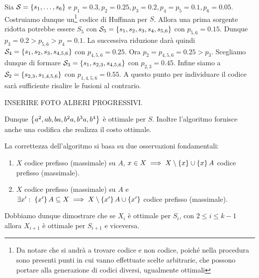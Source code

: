\begin{example}{}
  Sia \(\SCal = \set{s_1,\ldots, s_6}\) e \(p_1 = 0.3,p_2=0.25,p_3=0.2,p_4=p_5=0.1,p_6=0.05\). Costruiamo dunque un\footnote{Da notare che si andrà a trovare  codice e non  codice, poiché nella procedura sono presenti punti in cui vanno effettuate scelte arbitrarie, che possono portare alla generazione di codici diversi, ugualmente ottimali} codice di Huffman per \(S\).
  Allora una prima sorgente ridotta potrebbe essere \(S_5\) con \(\SCal_5 = \set{s_1,s_2,s_3,s_4,s_{5,6}}\) con \(p_{5,6} = 0.15\). Dunque \(p_3 = 0.2 > p_{5,6} > p_4 = 0.1\).
  La successiva riduzione darà quindi \(\SCal_4 = \set{s_1,s_2,s_{3},s_{4,5,6}}\) con \(p_{4,5,6} = 0.25\). Ora \(p_2 = p_{4,5,6} = 0.25 > p_3\).
  Scegliamo dunque di formare \(\SCal_3 = \set{s_1,s_{2,3},s_{4,5,6}}\) con \(p_{2,3} = 0.45\).
  Infine siamo a \(\SCal_2 = \set{s_{2,3}, s_{1,4,5,6}}\) con \(p_{1,4,5,6} = 0.55\).
  A questo punto per individuare il codice sarà sufficiente risalire le fusioni al contrario.

  INSERIRE FOTO ALBERI PROGRESSIVI.

  Dunque \(\set{a^2,ab,ba,b^2a,b^3a,b^4}\) è ottimale per \(S\). Inoltre l'algoritmo fornisce anche una codifica che realizza il costo ottimale.
\end{example}

La correttezza dell'algoritmo si basa su due osservazioni fondamentali:
\begin{enumerate}
  \item \(X\) codice prefisso (massimale) su \(A\), \(x \in X \implies X \setminus \set{x} \cup \set{x}A\) codice prefisso (massimale).
  \item \(X\) codice prefisso (massimale) su \(A\) e \(\exists x' \st \set{x'}A \subseteq X \implies X\setminus \set{x'}A \cup \set{x'}\) codice prefisso (massimale).
 \end{enumerate}

Dobbiamo dunque dimostrare che se \(X_i\) è ottimale per \(S_i\), con \(2\leq i \leq k-1\) allora \(X_{i+1}\) è ottimale per \(S_{i+1}\) e viceversa.

